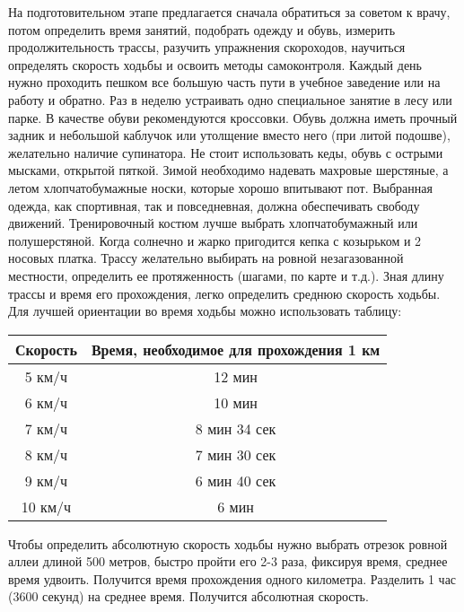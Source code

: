 \documentclass[14pt, a4paper]{article}
\begin{document}
    На  подготовительном этапе предлагается сначала обратиться за советом к врачу, потом определить время занятий, подобрать одежду и обувь, измерить продолжительность трассы, разучить упражнения скороходов, научиться определять скорость ходьбы и освоить методы самоконтроля. Каждый день нужно проходить пешком все большую часть пути в учебное заведение или на работу и обратно. Раз в неделю устраивать одно специальное занятие в лесу или парке. В качестве обуви рекомендуются кроссовки. Обувь должна иметь прочный задник и небольшой каблучок или утолщение вместо него (при литой подошве), желательно наличие супинатора. Не стоит использовать кеды, обувь с острыми мысками, открытой пяткой. Зимой необходимо надевать махровые шерстяные, а летом хлопчатобумажные носки, которые хорошо впитывают пот. Выбранная одежда, как спортивная, так и повседневная, должна обеспечивать свободу движений. Тренировочный  костюм лучше выбрать хлопчатобумажный или полушерстяной. Когда солнечно и жарко пригодится кепка с козырьком и 2 носовых платка. Трассу желательно выбирать на ровной незагазованной местности, определить ее  протяженность (шагами, по карте и т.д.). Зная длину трассы и время его прохождения, легко определить среднюю скорость ходьбы. Для лучшей ориентации во время ходьбы  можно использовать таблицу:

    \begin{center}
        \begin{tabular}{ | c | c | }
            \hline
            Скорость & Время, необходимое для прохождения 1 км \\
            \hline
            5 км/ч & 12 мин \\
            \hline
            6 км/ч & 10 мин \\
            \hline
            7 км/ч & 8 мин 34 сек \\
            \hline
            8 км/ч & 7 мин 30 сек \\
            \hline
            9 км/ч & 6 мин 40 сек \\
            \hline
            10 км/ч & 6 мин \\
            \hline
        \end{tabular}
    \end{center}

    Чтобы определить абсолютную скорость ходьбы нужно выбрать отрезок ровной аллеи длиной 500 метров, быстро пройти его 2-3 раза, фиксируя время, среднее время удвоить. Получится время прохождения одного километра. Разделить 1 час (3600 секунд) на среднее время. Получится абсолютная скорость.
\end{document}
